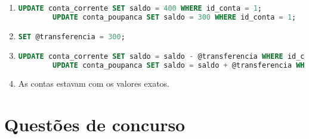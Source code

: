 \documentclass{article}
\begin{document}
\begin{enumerate}[label=\alph*)]

    \item 
    \begin{lstlisting}[language=SQL]
        UPDATE conta_corrente SET saldo = 400 WHERE id_conta = 1;
        UPDATE conta_poupanca SET saldo = 300 WHERE id_conta = 1;
    \end{lstlisting}

    \item 
    \begin{lstlisting}[language=SQL]
        SET @transferencia = 300;
    \end{lstlisting}

    \item 
    \begin{lstlisting}[language=SQL]
        UPDATE conta_corrente SET saldo = saldo - @transferencia WHERE id_conta = 1;
        UPDATE conta_poupanca SET saldo = saldo + @transferencia WHERE id_conta = 1;
    \end{lstlisting}

    \item As contas estavam com os valores exatos.
\end{enumerate}

\section*{Questões de concurso}
\end{document}
